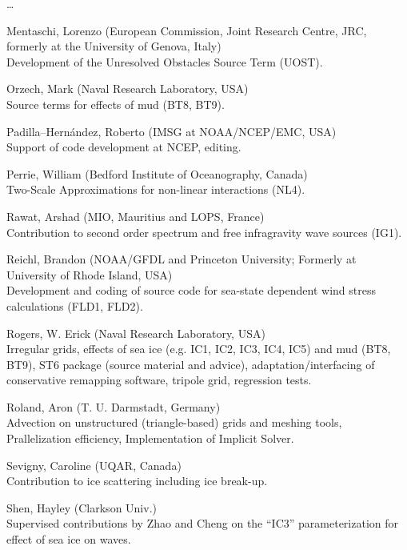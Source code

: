 \begin{list}{\ldots}{ }
\item [Mentaschi, Lorenzo]  (European Commission, Joint Research Centre, JRC,
  formerly at the University of Genova, Italy)\\ 
  Development of the Unresolved Obstacles Source Term (UOST).
 
\item [Orzech, Mark]  (Naval Research Laboratory, USA)\\ 
  Source terms for effects of mud (BT8, BT9).

\item [Padilla--Hern\'andez, Roberto]  (IMSG at NOAA/NCEP/EMC, USA)\\ 
  Support of code development at NCEP, editing.

\item [Perrie, William] (Bedford Institute of Oceanography, Canada)\\
 Two-Scale Approximations for non-linear interactions (NL4).

\item [Rawat, Arshad] (MIO, Mauritius and LOPS, France) \\
  Contribution to second order spectrum and free infragravity wave sources (IG1).    

\item [Reichl, Brandon] (NOAA/GFDL and Princeton University; Formerly at University of Rhode Island, USA) \\
  Development and coding of source code for sea-state dependent wind stress calculations (FLD1, FLD2).

\item [Rogers, W. Erick]  (Naval Research Laboratory, USA)\\ 
  Irregular grids, effects of sea ice (e.g. IC1, IC2, IC3, IC4, IC5) and mud (BT8, BT9), ST6 package (source material and advice), adaptation/interfacing of conservative remapping software, tripole grid, regression tests.

\item [Roland, Aron] (T. U. Darmstadt, Germany) \\
  Advection on unstructured (triangle-based) grids and meshing tools, Prallelization efficiency, Implementation of Implicit Solver.

\item [Sevigny, Caroline] (UQAR, Canada) \\
  Contribution to ice scattering including ice break-up.

\item [Shen, Hayley] (Clarkson Univ.) \\
  Supervised contributions by Zhao and Cheng on the ``IC3'' parameterization for effect of sea ice on waves.


\end{list}
